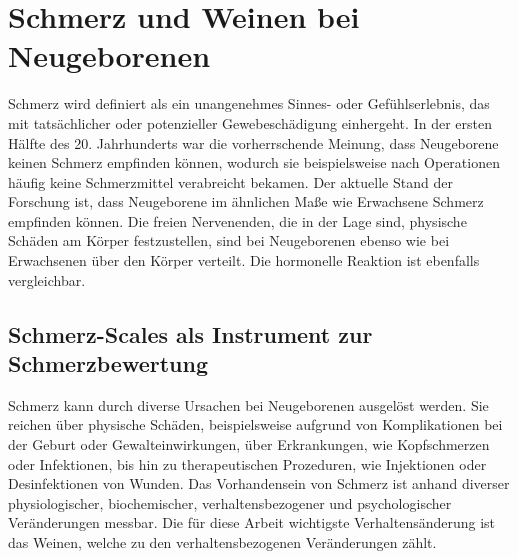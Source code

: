 \section{Schmerz und Weinen bei Neugeborenen}
\label{sec:medicalFoundations} 

Schmerz wird definiert als ein \glqq unangenehmes Sinnes- oder Gefühlserlebnis, das mit tatsächlicher oder potenzieller Gewebeschädigung einhergeht\grqq{}.\cite[S. 438]{PainAssessment01} In der ersten Hälfte des 20. Jahrhunderts war die vorherrschende Meinung, dass Neugeborene keinen Schmerz empfinden können, wodurch sie beispielsweise nach Operationen häufig keine Schmerzmittel verabreicht bekamen. Der aktuelle Stand der Forschung ist, dass Neugeborene im ähnlichen Maße wie Erwachsene Schmerz empfinden können. Die freien Nervenenden, die in der Lage sind, physische Schäden am Körper festzustellen, sind bei Neugeborenen ebenso wie bei Erwachsenen über den Körper verteilt. Die hormonelle Reaktion ist ebenfalls vergleichbar.\cite[S. 402]{PainAssessment03} \cite[S. 438]{PainAssessment01}

\subsection{Schmerz-Scales als Instrument zur Schmerzbewertung}
\label{sec:painScores}

Schmerz kann durch diverse Ursachen bei Neugeborenen ausgelöst werden. Sie reichen über physische Schäden, beispielsweise aufgrund von Komplikationen bei der Geburt oder Gewalteinwirkungen, über Erkrankungen, wie Kopfschmerzen oder Infektionen, bis hin zu therapeutischen Prozeduren, wie Injektionen oder Desinfektionen von Wunden. Das Vorhandensein von Schmerz ist anhand diverser physiologischer, biochemischer, verhaltensbezogener und psychologischer Veränderungen messbar. Die für diese Arbeit wichtigste Verhaltensänderung ist das Weinen, welche zu den verhaltensbezogenen Veränderungen zählt.\cite[S. 441]{PainAssessment01} 

